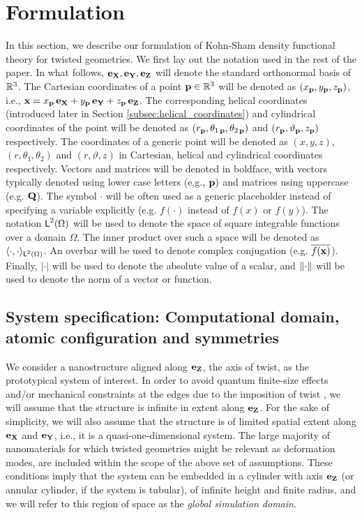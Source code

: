 \documentclass[preprint,12pt, 3p, sort&compress]{elsarticle}
\begin{document}
\section{Formulation} \label{Section:Formulation}
\label{sec:formulation}
In this section, we describe our formulation of Kohn-Sham density functional theory for
twisted geometries. We first lay out the notation used in the rest of the paper. In what follows, ${\bf e}_{{\bf X}}, {\bf e}_{{\bf Y}}, {\bf e}_{{\bf Z}}$ will denote the standard orthonormal basis of $\mathbb{R}^3$. The Cartesian coordinates of a point ${\bf p} \in \mathbb{R}^3$ will be denoted as $(x_{{\bf p}},y_{{\bf p}},z_{{\bf p}})$, i.e.,  ${\bf x} = x_{{\bf p}}\,{\bf e}_{{\bf X}} + y_{{\bf p}}\,{\bf e}_{{\bf Y}} + z_{{\bf p}}\,{\bf e}_{{\bf Z}}$. The corresponding helical coordinates (introduced later in Section \ref{subsec:helical_coordinates}) and cylindrical coordinates of the point will be denoted as $(r_{{\bf p}},\theta_{1\,{{\bf p}}},\theta_{2\,{{\bf p}}})$ and $(r_{{\bf p}},\vartheta_{{\bf p}},z_{{\bf p}})$  respectively. The coordinates of a generic point will be denoted as $(x,y,z)$, $(r,\theta_1,\theta_2)$ and $(r,\vartheta, z)$  in Cartesian, helical and cylindrical coordinates respectively. Vectors and matrices will be denoted in boldface, with vectors typically denoted using lower case letters (e.g., ${\bf p})$ and matrices using uppercase (e.g. ${{\bf Q}}$). The symbol $\cdot$ will be often used as a generic placeholder instead of specifying a variable explicitly (e.g. $f(\cdot)$ instead of $f(x)$ or $f(y)$). The notation $\textsf{L}^{2}_{}(\Omega)$ will be used to denote the space of square integrable functions over a domain $\Omega$. The inner product over such a space will be denoted as $\langle\cdot,\cdot\rangle_{\textsf{L}^{2}_{}(\Omega)}$. An overbar will be used to denote complex conjugation (e.g. $\overline{f({\bf x})}$). Finally, $\lvert \cdot \rvert$ will be used to denote the absolute value of a scalar, and $\lVert\cdot\rVert_{}$ will be used to denote the norm of a vector or function.
\subsection{System specification: Computational domain, atomic configuration and symmetries}
\label{subsec:system_specification}
We consider a nanostructure aligned along $ {\bf e}_{{\bf Z}}$, the axis of twist, as the prototypical system of interest.  In order to avoid quantum finite-size effects and/or mechanical constraints at the edges due to the imposition of twist \citep{koskinen2016quantum, Pekka_Efficient_Approach} , we will assume that the structure is infinite in extent along ${\bf e}_{{\bf Z}}$. For the sake of simplicity, we will also assume that the structure is of limited spatial extent along  ${\bf e}_{{\bf X}}$ and  ${\bf e}_{{\bf Y}}$, i.e., it is a quasi-one-dimensional system. The large majority of nanomaterials for which twisted geometries might be relevant as deformation modes, are included within the scope of the above set of assumptions. These conditions imply that the system can be embedded in a cylinder with axis ${\bf e}_{{\bf Z}}$ (or annular cylinder, if the system is tubular), of infinite height and finite radius, and we will refer to this region of space as the \textit{global simulation domain}.
\end{document}
